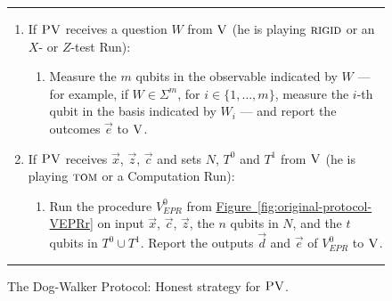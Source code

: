 \documentclass[11pt]{article}
\numberwithin{equation}{section}
\theoremstyle{definition}
\theoremstyle{plain}
\newcommand{\expref}[2]{\hyperref[#2]{#1~\ref{#2}}}
\newcommand{\rigid}{\textsc{rigid}}
\newcommand{\tom}{\textsc{tom}}
\newcommand{\ver}{\textsc{V}}
\newcommand{\pv}{\textsc{PV}}
\begin{document}
\begin{figure}[H]
\rule[1ex]{\textwidth}{0.5pt}
\vspace{-20pt}
\begin{enumerate}
  \item If $\pv$ receives a question ${W}$ from $\ver$ (he is playing $\rigid$ or an $X$- or $Z$-test Run):
\begin{enumerate}
     \item[]  Measure the $m$ qubits in the observable indicated by $W$ --- for example, if $W\in \Sigma^m$, for $i\in \{1,\ldots,m\}$, measure the $i$-th qubit in the basis indicated by $W_i$ --- and report the outcomes $\vec{e}$ to $\ver$.
\end{enumerate}

  \item If $\pv$ receives $\vec{x}$, $\vec{z}$, $\vec{c}$ and sets $N$, $T^0$ and $T^1$ from $\ver$ (he is playing $\tom$ or a Computation Run):
\begin{enumerate}
	\item[] Run the procedure $V_{EPR}^0$ from \expref{Figure}{fig:original-protocol-VEPRr} on input $\vec{x}$, $\vec{c}$, $\vec{z}$, the $n$ qubits in $N$, and the $t$ qubits in $T^0\cup T^1$. Report the outputs  $\vec{d}$ and $\vec{e}$ of $V_{EPR}^0$ to $\ver$.
\end{enumerate}
\end{enumerate}
\rule[2ex]{\textwidth}{0.5pt}\vspace{-.5cm}
\caption{The Dog-Walker Protocol: Honest strategy for $\pv$.}\label{fig:dogwalker-protocol-PV}
\end{figure}
\end{document}
